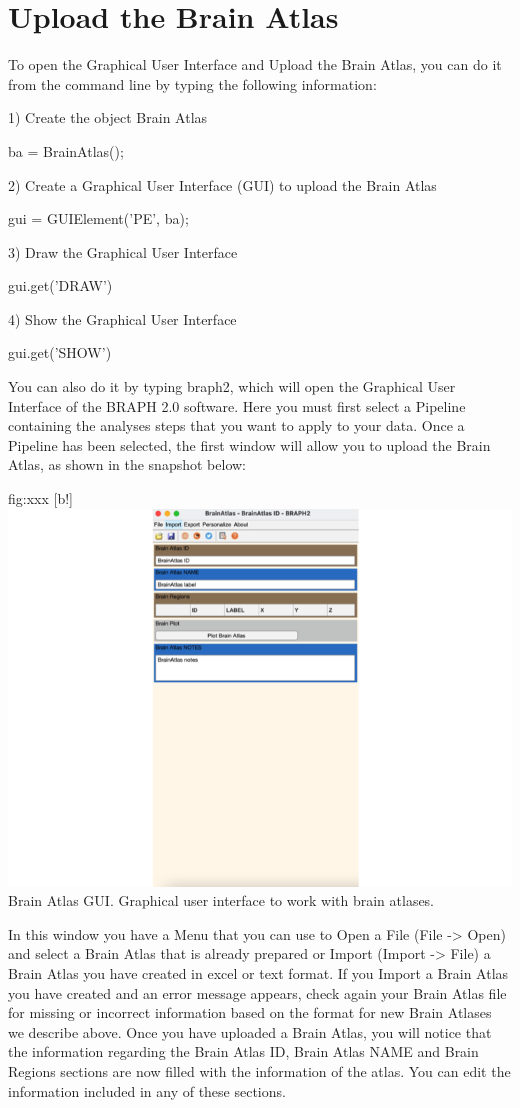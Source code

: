 \documentclass{tufte-handout}
\begin{document}
	
\section{Upload the Brain Atlas}

To open the Graphical User Interface and Upload the Brain Atlas, you can do it from the command line by typing the following information:


1) Create the object Brain Atlas

ba = BrainAtlas();


2) Create a Graphical User Interface (GUI) to upload the Brain Atlas

gui = GUIElement('PE', ba);


3) Draw the Graphical User Interface

gui.get('DRAW')


4) Show  the Graphical User Interface

gui.get('SHOW')


You can also do it by typing braph2, which will open the Graphical User Interface of the BRAPH 2.0 software. Here you must first select a Pipeline containing the analyses steps that you want to apply to your data. Once a Pipeline has been selected, the first window will allow you to upload the Brain Atlas, as shown in the snapshot below:

	{fig:xxx}
	{
	[b!]
	\includegraphics{tut_ba/fig7.png}
	}
	{Brain Atlas GUI.}
	{
	Graphical user interface to work with brain atlases. 
	}

In this window you have a Menu that you can use to Open a File (File -> Open) and select a Brain Atlas that is already prepared or Import (Import -> File) a Brain Atlas you have created in excel or text format. If you Import a Brain Atlas you have created and an error message appears, check again your Brain Atlas file for missing or incorrect information based on the format for new Brain Atlases we describe above. 
Once you have uploaded a Brain Atlas, you will notice that the information regarding the Brain Atlas ID, Brain Atlas NAME and Brain Regions sections are now filled with the information of the atlas. You can edit the information included in any of these sections. 
\end{document}
